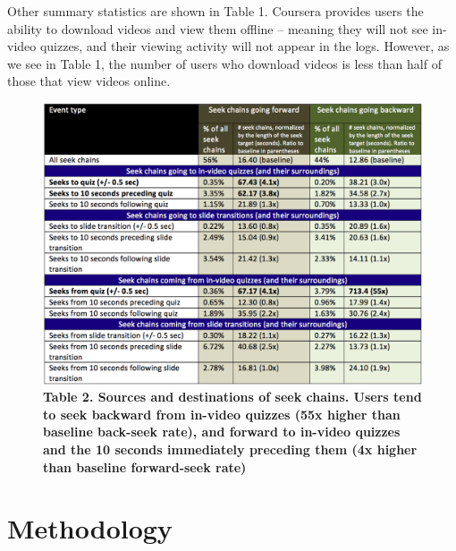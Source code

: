 \documentclass{sigchi}
\begin{document}
Other summary statistics are shown in Table 1. Coursera provides users the ability to download videos and view them offline -- meaning they will not see in-video quizzes, and their viewing activity will not appear in the logs. However, as we see in Table 1, the number of users who download videos is less than half of those that view videos online. 


\begin{figure}
\includegraphics[width=1.0\columnwidth]{seek-sources-and-destinations-table}
\small{\textbf{Table 2. Sources and destinations of seek chains. Users tend to seek backward from in-video quizzes (55x higher than baseline back-seek rate), and forward to in-video quizzes and the 10 seconds immediately preceding them (4x higher than baseline forward-seek rate)}}
\label{fig:seek-sources-and-destinations-table}
\end{figure}

\section{Methodology}
\end{document}
